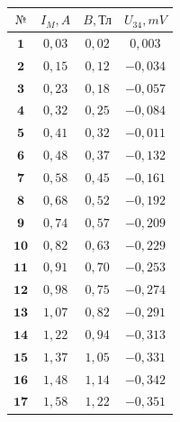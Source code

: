 \documentclass[11pt,a4paper]{article}
\begin{document}
\begin{paracol}{2}
\begin{table}[h!]
\begin{center}
		\\
		\begin{tabular}{|c|c|c|c|} 
			\hline 
			$\text{№}$ & $I_M,A$ & $B,\text{Тл}$ & $U_{34},mV$ \\ \hline 
			$\textbf{1}$ & $0,03$ & $0,02$ & $0,003$ \\ \hline 
			$\textbf{2}$ & $0,15$ & $0,12$ & $-0,034$ \\ \hline 
			$\textbf{3}$ & $0,23$ & $0,18$ & $-0,057$ \\ \hline 
			$\textbf{4}$ & $0,32$ & $0,25$ & $-0,084$ \\ \hline 
			$\textbf{5}$ & $0,41$ & $0,32$ & $-0,011$ \\ \hline 
			$\textbf{6}$ & $0,48$ & $0,37$ & $-0,132$ \\ \hline 
			$\textbf{7}$ & $0,58$ & $0,45$ & $-0,161$ \\ \hline 
			$\textbf{8}$ & $0,68$ & $0,52$ & $-0,192$ \\ \hline 
			$\textbf{9}$ & $0,74$ & $0,57$ & $-0,209$ \\ \hline 
			$\textbf{10}$ & $0,82$ & $0,63$ & $-0,229$ \\ \hline 
			$\textbf{11}$ & $0,91$ & $0,70$ & $-0,253$ \\ \hline 
			$\textbf{12}$ & $0,98$ & $0,75$ & $-0,274$ \\ \hline 
			$\textbf{13}$ & $1,07$ & $0,82$ & $-0,291$ \\ \hline 
			$\textbf{14}$ & $1,22$ & $0,94$ & $-0,313$ \\ \hline 
			$\textbf{15}$ & $1,37$ & $1,05$ & $-0,331$ \\ \hline 
			$\textbf{16}$ & $1,48$ & $1,14$ & $-0,342$ \\ \hline
			$\textbf{17}$ & $1,58$ & $1,22$ & $-0,351$ \\ \hline 
		\end{tabular} 
	\end{center} 
\end{table}
\end{paracol}
\newpage
\end{document}
